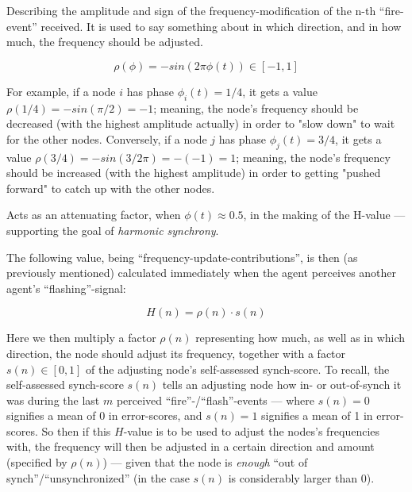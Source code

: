 			Describing the amplitude and sign of the frequency-modification of the n-th ``fire-event'' received. It is used to say something about in which direction, and in how much, the frequency should be adjusted.
			
			\begin{equation}
			\label{amp_sign_freq_adj}
				\rho(\phi) = - sin(2\pi\phi(t)) \in [-1, 1]
			\end{equation}
			
			For example, if a node $i$ has phase $\phi_i(t)=1/4$, it gets a value $\rho(1/4) = - sin(\pi/2) = -1$; meaning, the node's frequency should be decreased (with the highest amplitude actually) in order to "slow down" to wait for the other nodes. Conversely, if a node $j$ has phase $\phi_j(t)=3/4$, it gets a value $\rho(3/4) = - sin(3/2 \pi) = -(-1) = 1$; meaning, the node's frequency should be increased (with the highest amplitude) in order to getting "pushed forward" to catch up with the other nodes.
			
			Acts as an attenuating factor, when $\phi(t)\approx0.5$, in the making of the H-value — supporting the goal of \textit{harmonic synchrony}.

			
			The following value, being ``frequency-update-contributions'', is then (as previously mentioned) calculated immediately when the agent perceives another agent's ``flashing''-signal:
			
			\begin{equation}
			\label{h_value}
				H(n) = \rho(n) \cdot s(n)
			\end{equation}
			
			Here we then multiply a factor $\rho(n)$ representing how much, as well as in which direction, the node should adjust its frequency, together with a factor $s(n) \in [0,1]$ of the adjusting node's self-assessed synch-score. To recall, the self-assessed synch-score $s(n)$ tells an adjusting node how in- or out-of-synch it was during the last $m$ perceived ``fire''-/``flash''-events — where $s(n)=0$ signifies a mean of 0 in error-scores, and $s(n)=1$ signifies a mean of 1 in error-scores. So then if this $H$-value is to be used to adjust the nodes's frequencies with, the frequency will then be adjusted in a certain direction and amount (specified by $\rho(n)$) — given that the node is \textit{enough} ``out of synch''/``unsynchronized'' (in the case $s(n)$ is considerably larger than 0).
			
